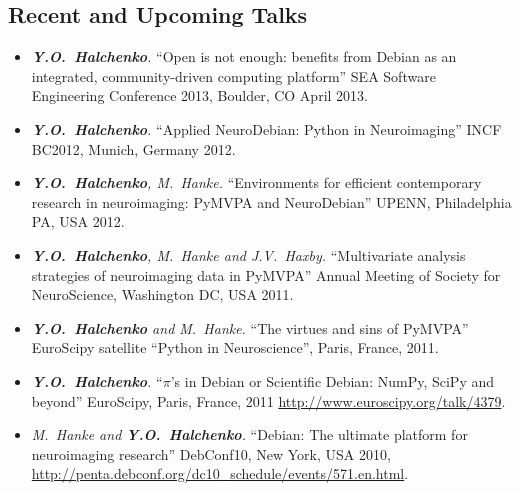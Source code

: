 \documentclass[12pt,overlapped,line]{res}
\newcommand{\mtitle}[1]{``#1''}
\newcommand{\mauthors}[1]{ \textit{#1.}}
\newcommand{\mwhere}[1]{#1.}
\begin{document}
\begin{resume}
\section{Recent and Upcoming Talks}

 \begin{itemize}

 \item
   \mauthors{\textbf{Y.O.~Halchenko}}
   \mtitle{Open is not enough: benefits from Debian as an integrated,
     community-driven computing platform}%
   \mwhere{SEA Software Engineering Conference 2013, Boulder, CO April
     2013}

 \item
   \mauthors{\textbf{Y.O.~Halchenko}}
   \mtitle{Applied NeuroDebian: Python in Neuroimaging}
   \mwhere{INCF BC2012, Munich, Germany 2012}

 \item
   \mauthors{\textbf{Y.O.~Halchenko}, M.~Hanke}
   \mtitle{Environments for efficient contemporary research in neuroimaging: {PyMVPA} and {NeuroDebian}}
   \mwhere{UPENN, Philadelphia PA, USA 2012}

 \item
   \mauthors{\textbf{Y.O.~Halchenko}, M.~Hanke and J.V.~Haxby}
   \mtitle{Multivariate analysis strategies of neuroimaging data in PyMVPA}
   \mwhere{Annual Meeting of Society for NeuroScience, Washington DC,  USA 2011}

 \item
   \mauthors{\textbf{Y.O.~Halchenko} and M.~Hanke}
   \mtitle{The virtues and sins of PyMVPA}
   \mwhere{EuroScipy satellite ``Python in Neuroscience'', Paris, France, 2011}


 \item
   \mauthors{\textbf{Y.O.~Halchenko}}
   \mtitle{$\pi$'s in Debian or Scientific Debian: NumPy, SciPy and beyond}
   \mwhere{EuroScipy, Paris, France, 2011
     \url{http://www.euroscipy.org/talk/4379}}

 \item
   \mauthors{M.~Hanke and \textbf{Y.O.~Halchenko}}
   \mtitle{Debian: The ultimate platform for neuroimaging
     research}
   \mwhere{DebConf10, New York, USA 2010,
     \url{http://penta.debconf.org/dc10_schedule/events/571.en.html}}



\end{itemize}
\end{resume}
\end{document}
